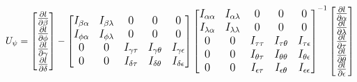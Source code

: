 \documentclass[hidelinks]{article}
\begin{document}
\[
\large
U_{\psi} = \begin{bmatrix}\frac{\partial l }{\partial \beta} \\  \frac{\partial l }{\partial \phi} \\  \frac{\partial l }{\partial \gamma} \\  \frac{\partial l }{\partial \delta}   \end{bmatrix}
 - \begin{bmatrix} I_{\beta\alpha} & I_{\beta\lambda} & 0  &   0 & 0  \\  I_{\phi\alpha} & I_{\phi\lambda}& 0 &0 &0 \\ 0 & 0 &  I_{\gamma\tau} & I_{\gamma\theta} & I_{\gamma\epsilon} \\ 0 & 0 &I_{\delta\tau} & I_{\delta\theta} & I_{\delta\epsilon}  \end{bmatrix} \begin{bmatrix} I_{\alpha\alpha} & I_{\alpha\lambda} & 0&  0 & 0 \\ I_{\lambda\alpha} & I_{\lambda\lambda} & 0 &  0 & 0 \\ 0& 0 & I_{\tau\tau} &  I_{\tau\theta} &I_{\tau\epsilon }\\ 0 &0 & I_{\theta\tau} &  I_{\theta\theta} &I_{\theta\epsilon}\\  0 & 0 & I_{\epsilon\tau} & I_{\epsilon\theta} &I_{\epsilon\epsilon} \end{bmatrix}^{-1} \begin{bmatrix} \frac{\partial l}{\partial \alpha}  \\  \frac{\partial l}{\partial \lambda}  \\ \frac{\partial l}{\partial \tau}  \\   \frac{\partial l}{\partial \theta}  \\ \frac{\partial l}{\partial \epsilon} \end{bmatrix}
\]

\end{document}
